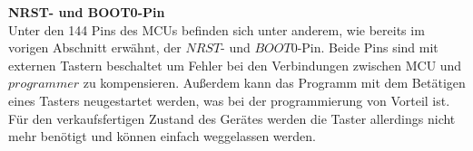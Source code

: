 \newline
\textbf{NRST- und BOOT0-Pin}\\
Unter den 144 Pins des MCUs befinden sich unter anderem, wie bereits im vorigen Abschnitt erwähnt, der $NRST$- und $BOOT0$-Pin. Beide Pins sind mit externen Tastern beschaltet um Fehler bei den Verbindungen zwischen MCU und $programmer$ zu kompensieren. Außerdem kann das Programm mit dem Betätigen eines Tasters neugestartet werden, was bei der programmierung von Vorteil ist. Für den verkaufsfertigen Zustand des Gerätes werden die Taster allerdings nicht mehr benötigt und können einfach weggelassen werden. 